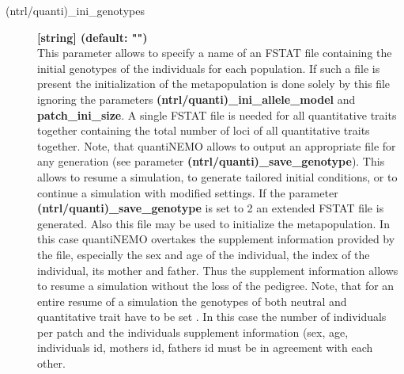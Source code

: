 \documentclass[letterpaper,12pt,oneside]{book}
\begin{document}
\begin{description}
\item[(ntrl/quanti)\_ini\_genotypes] \textbf{[string] (default: "")}\\
This parameter allows to specify a name of an FSTAT file \citep{Goudet_1995} containing the initial genotypes of the individuals for each population. If such a file is present the initialization of the metapopulation is done solely by this file ignoring the parameters \textbf{(ntrl/quanti)\_ini\_allele\_model} and \textbf{patch\_ini\_size}. A single FSTAT file is needed for all quantitative traits together containing the total number of loci of all quantitative traits together. Note, that quantiNEMO allows to output an appropriate file for any generation (see parameter \textbf{(ntrl/quanti)\_save\_genotype}). This allows to resume a simulation, to generate tailored initial conditions, or to continue a simulation with modified settings. If the parameter \textbf{(ntrl/quanti)\_save\_genotype} is set to 2 an extended FSTAT file is generated. Also this file may be used to initialize the metapopulation. In this case quantiNEMO overtakes the supplement information provided by the file, especially the sex and age of the individual, the index of the individual, its mother and father. Thus the supplement information allows to resume a simulation without the loss of the pedigree. Note, that for an entire resume of a simulation the genotypes of both neutral and quantitative trait  have to be set . In this case the number of individuals per patch and the individuals supplement information (sex, age, individuals id, mothers id, fathers id must be in agreement with each other. 


\end{description}
\end{document}
